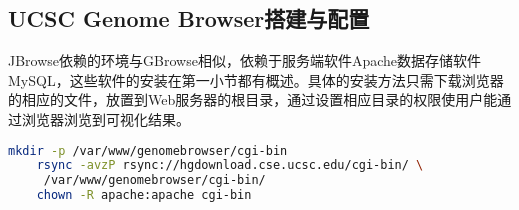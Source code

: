 	\subsection{UCSC Genome Browser搭建与配置}
	JBrowse依赖的环境与GBrowse相似，依赖于服务端软件Apache数据存储软件MySQL，这些软件的安装在第一小节都有概述。具体的安装方法只需下载浏览器的相应的文件，放置到Web服务器的根目录，通过设置相应目录的权限使用户能通过浏览器浏览到可视化结果。
	\begin{lstlisting}[language=bash]
	mkdir -p /var/www/genomebrowser/cgi-bin
	rsync -avzP rsync://hgdownload.cse.ucsc.edu/cgi-bin/ \
	 /var/www/genomebrowser/cgi-bin/
	chown -R apache:apache cgi-bin
	\end{lstlisting}
	